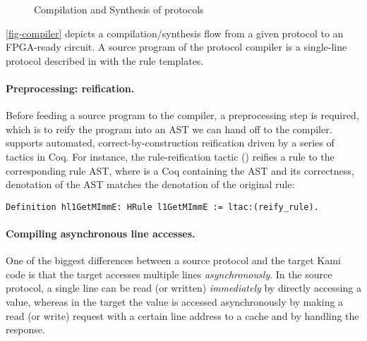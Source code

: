 \begin{figure}
  \caption{Compilation and Synthesis of \hemiola{} protocols}
  \label{fig-compiler}
\end{figure}

\autoref{fig-compiler} depicts a compilation/synthesis flow from a given \hemiola{} protocol to an FPGA-ready circuit.
A source program of the protocol compiler is a single-line protocol described in \hemiola{} with the rule templates.

\paragraph{Preprocessing: reification.}

Before feeding a \hemiola{} source program to the compiler, a preprocessing step is required, which is to reify the program into an AST we can hand off to the compiler.
\hemiola{} supports automated, correct-by-construction reification driven by a series of tactics in Coq.
For instance, the rule-reification tactic () reifies a \hemiola{} rule to the corresponding rule AST, where  is a Coq  containing the AST and its correctness, \ie{} denotation of the AST matches the denotation of the original rule:
\begin{lstlisting}[numbers=none, frame=none, xleftmargin=10pt]
Definition hl1GetMImmE: HRule l1GetMImmE := ltac:(reify_rule).
\end{lstlisting}

\paragraph{Compiling asynchronous line accesses.}

One of the biggest differences between a source \hemiola{} protocol and the target Kami code is that the target accesses multiple lines \emph{asynchronously}.
In the source protocol, a single line can be read (or written) \emph{immediately} by directly accessing a value, whereas in the target the value is accessed asynchronously by making a read (or write) request with a certain line address to a cache and by handling the response.


